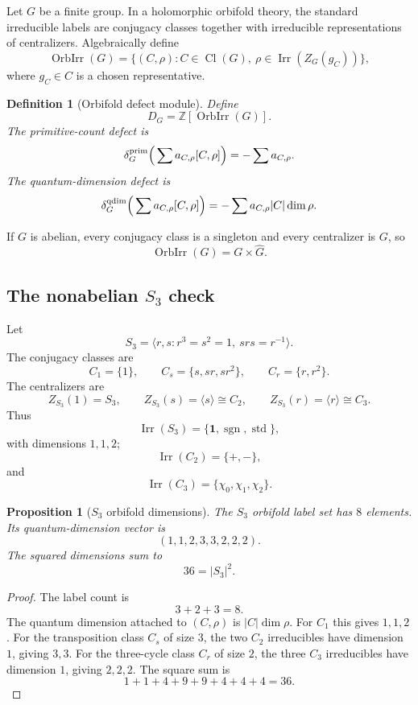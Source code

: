 \documentclass[11pt]{amsart}
\newtheorem{proposition}[theorem]{Proposition}
\newtheorem{definition}[theorem]{Definition}
\DeclareMathOperator{\Irr}{Irr}
\newcommand{\ZZ}{\mathbb Z}
\begin{document}
Let $G$ be a finite group.  In a holomorphic orbifold theory, the standard irreducible labels are conjugacy classes together with irreducible representations of centralizers.  Algebraically define
\[
        \operatorname{OrbIrr}(G)=
        \{(C,\rho): C\in\operatorname{Cl}(G),\ \rho\in\Irr(Z_G(g_C))\},
\]
where $g_C\in C$ is a chosen representative.

\begin{definition}[Orbifold defect module]
Define
\[
        D_G=\ZZ[\operatorname{OrbIrr}(G)].
\]
The primitive-count defect is
\[
        \delta_G^{\rm prim}\Big(\sum a_{C,\rho}[C,\rho]\Big)
        =-\sum a_{C,\rho}.
\]
The quantum-dimension defect is
\[
        \delta_G^{\rm qdim}\Big(\sum a_{C,\rho}[C,\rho]\Big)
        =-\sum a_{C,\rho}|C|\dim\rho.
\]
\end{definition}

If $G$ is abelian, every conjugacy class is a singleton and every centralizer is $G$, so
\[
        \operatorname{OrbIrr}(G)=G\times\widehat G.
\]

\subsection{The nonabelian $S_3$ check}

Let
\[
        S_3=\langle r,s:r^3=s^2=1,\ srs=r^{-1}\rangle.
\]
The conjugacy classes are
\[
        C_1=\{1\},
        \qquad
        C_s=\{s,sr,sr^2\},
        \qquad
        C_r=\{r,r^2\}.
\]
The centralizers are
\[
        Z_{S_3}(1)=S_3,
        \qquad
        Z_{S_3}(s)=\langle s\rangle\cong C_2,
        \qquad
        Z_{S_3}(r)=\langle r\rangle\cong C_3.
\]
Thus
\[
        \Irr(S_3)=\{\mathbf1,\operatorname{sgn},\operatorname{std}\},
\]
with dimensions $1,1,2$;
\[
        \Irr(C_2)=\{+,-\},
\]
and
\[
        \Irr(C_3)=\{\chi_0,\chi_1,\chi_2\}.
\]

\begin{proposition}[$S_3$ orbifold dimensions]
The $S_3$ orbifold label set has $8$ elements.  Its quantum-dimension vector is
\[
        (1,1,2,3,3,2,2,2).
\]
The squared dimensions sum to
\[
        36=|S_3|^2.
\]
\end{proposition}

\begin{proof}
The label count is
\[
        3+2+3=8.
\]
The quantum dimension attached to $(C,\rho)$ is $|C|\dim\rho$.  For $C_1$ this gives $1,1,2$.  For the transposition class $C_s$ of size $3$, the two $C_2$ irreducibles have dimension $1$, giving $3,3$.  For the three-cycle class $C_r$ of size $2$, the three $C_3$ irreducibles have dimension $1$, giving $2,2,2$.  The square sum is
\[
        1+1+4+9+9+4+4+4=36.
\]
\end{proof}
\end{document}
